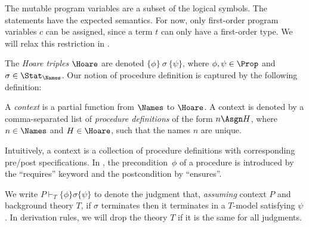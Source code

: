 \noindent The mutable program variables are a subset of the logical symbols.
The
statements have the expected semantics.
For now, only first-order program variables $c$ can be assigned, since a term $t$ can only have
a first-order type. We will relax this restriction in .


The \emph{Hoare triples} $\Hoare$ are denoted
$\{\phi\}\ \sigma\ \{\psi\}$, where $\phi,\psi \in \Prop$ and $\sigma
\in \Stat_{\Names}$.  Our notion of procedure definition is captured
by the following definition:

\begin{definition}
  A \emph{context} is a partial function from $\Names$ to $\Hoare$. A context is denoted
  by a comma-separated list of \emph{procedure definitions} of the form $n \Asgn H$, where
  $n\in \Names$ and $H\in \Hoare$, such that the names $n$ are unique.
\end{definition}

Intuitively, a context is a collection of procedure definitions with
corresponding pre/post specifications. In \Lang, the precondition~$\phi$ of a procedure
is introduced by the ``requires'' keyword and the postcondition by ``ensures''.

We write $P \vdash_T \{\phi\}
\sigma \{\psi\}$ to denote the judgment that, \emph{assuming} context
$P$ and background theory $T$, if $\sigma$ terminates then it
terminates in a $T$-model satisfying $\psi$. In derivation rules, we
will drop the theory $T$ if it is the same for all judgments.



